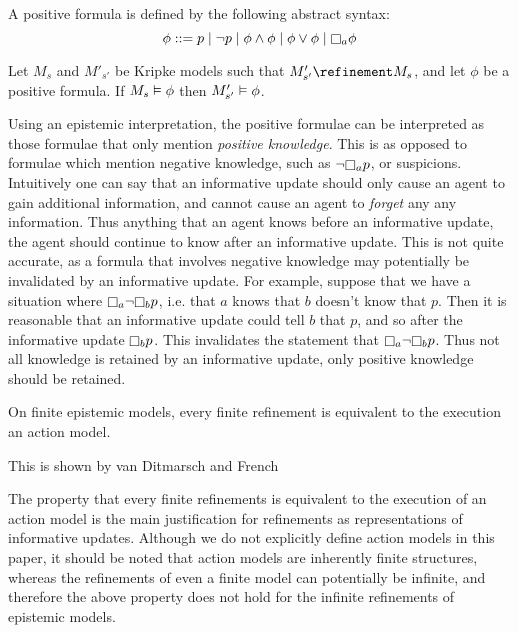 \begin{definition}
A positive formula is defined by the following abstract syntax:
$$
\phi ::=    p \bnfalt 
            \neg p \bnfalt
            \phi \land \phi \bnfalt
            \phi \lor \phi \bnfalt
            \knows_a \phi
$$
\end{definition}

\begin{proposition}
Let $M_s$ and $M'_{s'}$ be Kripke models such that $M'_{s'} \refinement M_s$,
and let $\phi$ be a positive formula. If $M_s \vDash \phi$ then $M'_{s'}
\vDash \phi$.
\end{proposition}

Using an epistemic interpretation, the positive formulae can be interpreted as
those formulae that only mention {\em positive knowledge}. This is as opposed to
formulae which mention negative knowledge, such as $\neg \knows_a p$, or
suspicions. Intuitively one can say that an informative update should only cause
an agent to gain additional information, and cannot cause an agent to {\em
forget} any any information. Thus anything that an agent knows before an
informative update, the agent should continue to know after an informative
update.  This is not quite accurate, as a formula that involves negative
knowledge may potentially be invalidated by an informative update. For example,
suppose that we have a situation where $\knows_a \neg \knows_b p$, i.e. that $a$
knows that $b$ doesn't know that $p$. Then it is reasonable that an informative
update could tell $b$ that $p$, and so after the informative update $\knows_b
p$. This invalidates the statement that $\knows_a \neg \knows_b p$. Thus not all
knowledge is retained by an informative update, only positive knowledge should
be retained.

\begin{proposition}
On finite epistemic models, every finite refinement is equivalent to the
execution an action model.
\end{proposition}

This is shown by van Ditmarsch and French~\cite{french2009simulation}

The property that every finite refinements is equivalent to the execution of an
action model is the main justification for refinements as representations of
informative updates. Although we do not explicitly define action models in this
paper, it should be noted that action models are inherently finite structures,
whereas the refinements of even a finite model can potentially be infinite, and
therefore the above property does not hold for the infinite refinements of
epistemic models.
